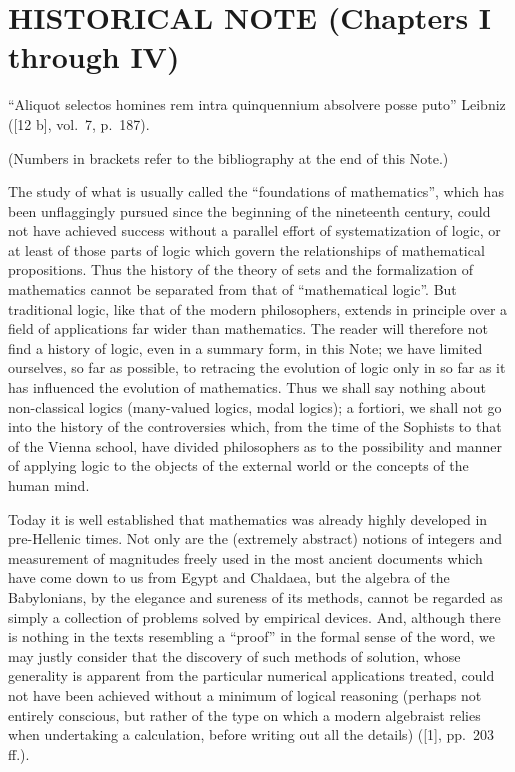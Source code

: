 \section*{HISTORICAL NOTE (Chapters I through IV)}
{}

``Aliquot selectos homines rem intra quinquennium absolvere posse puto'' Leibniz ({[}12 b{]}, vol.~7, p.~187).

(Numbers in brackets refer to the bibliography at the end of this Note.)

The study of what is usually called the ``foundations of mathematics'', which has been unflaggingly pursued since the beginning of the nineteenth century, could not have achieved success without a parallel effort of systematization of logic, or at least of those parts of logic which govern the relationships of mathematical propositions. Thus the history of the theory of sets and the formalization of mathematics cannot be separated from that of ``mathematical logic''. But traditional logic, like that of the modern philosophers, extends in principle over a field of applications far wider than mathematics. The reader will therefore not find a history of logic, even in a summary form, in this Note; we have limited ourselves, so far as possible, to retracing the evolution of logic only in so far as it has influenced the evolution of mathematics. Thus we shall say nothing about non-classical logics (many-valued logics, modal logics); a fortiori, we shall not go into the history of the controversies which, from the time of the Sophists to that of the Vienna school, have divided philosophers as to the possibility and manner of applying logic to the objects of the external world or the concepts of the human mind.

Today it is well established that mathematics was already highly developed in pre-Hellenic times. Not only are the (extremely abstract) notions of integers and measurement of magnitudes freely used in the most ancient documents which have come down to us from Egypt and Chaldaea, but the algebra of the Babylonians, by the elegance and sureness of its methods, cannot be regarded as simply a collection of problems solved by empirical devices. And, although there is nothing in the texts resembling a ``proof'' in the formal sense of the word, we may justly consider that the discovery of such methods of solution, whose generality is apparent from the particular numerical applications treated, could not have been achieved without a minimum of logical reasoning (perhaps not entirely conscious, but rather of the type on which a modern algebraist relies when undertaking a calculation, before writing out all the details) ({[}1{]}, pp.~203 ff.).

